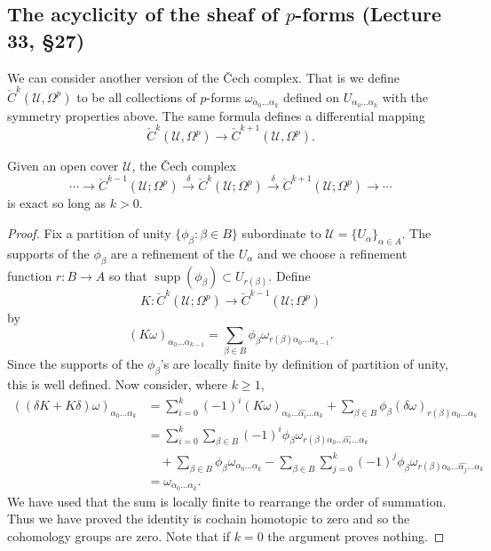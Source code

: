 \subsection*{The acyclicity of the sheaf of $p$-forms (Lecture 33, \S27)}
We can consider another version of the \v Cech complex. That is we define $\check C^k(\mathcal U,\Omega^p)$ to be all collections of $p$-forms $\omega_{\alpha_0\ldots\alpha_k}$ defined on $U_{\alpha_0\ldots\alpha_k}$ with the symmetry properties above. The same formula defines a differential mapping
\[
\check C^k(\mathcal U,\Omega^p)\longrightarrow\check C^{k+1}(\mathcal U,\Omega^p).
\]
\begin{lemma}[27.1]
Given an open cover $\mathcal U$, the \v Cech complex
\[
\cdots\longrightarrow\check C^{k-1}(\mathcal U;\Omega^p)
\xrightarrow{\delta}\check C^k(\mathcal U;\Omega^p)
\xrightarrow{\delta}\check C^{k+1}(\mathcal U;\Omega^p)\longrightarrow\cdots
\]
is exact so long as $k>0$.
\end{lemma}
\begin{proof}
Fix a partition of unity $\{\phi_\beta:\beta\in B\}$ subordinate to $\mathcal U=\{U_\alpha\}_{\alpha\in A}$. The supports of the $\phi_\beta$ are a refinement of the $U_\alpha$ and we choose a refinement function $r:B\to A$ so that $\operatorname{supp}(\phi_\beta)\subset U_{r(\beta)}$. Define
\[
K:\check C^k(\mathcal U;\Omega^p)\longrightarrow\check C^{k-1}(\mathcal U;\Omega^p)
\]
by
\[
(K\omega)_{\alpha_0\ldots\alpha_{k-1}}
=\sum_{\beta\in B}\phi_\beta\omega_{r(\beta)\alpha_0\ldots\alpha_{k-1}}.
\]
Since the supports of the $\phi_\beta$'s are locally finite by definition of partition of unity, this is well defined. Now consider, where $k\ge1$,
\begin{align*}
((\delta K+K\delta)\omega)_{\alpha_0\ldots\alpha_k}
&=\sum_{i=0}^k(-1)^i(K\omega)_{\alpha_0\ldots\widehat{\alpha_i}\ldots\alpha_k}
 +\sum_{\beta\in B}\phi_\beta(\delta\omega)_{r(\beta)\alpha_0\ldots\alpha_k}\\
&=\sum_{i=0}^k\sum_{\beta\in B}(-1)^i\phi_\beta
\omega_{r(\beta)\alpha_0\ldots\widehat{\alpha_i}\ldots\alpha_k}\\
&\quad+\sum_{\beta\in B}\phi_\beta\omega_{\alpha_0\ldots\alpha_k}
-\sum_{\beta\in B}\sum_{j=0}^k(-1)^j\phi_\beta
\omega_{r(\beta)\alpha_0\ldots\widehat{\alpha_j}\ldots\alpha_k}\\
&=\omega_{\alpha_0\ldots\alpha_k}.
\end{align*}
We have used that the sum is locally finite to rearrange the order of summation. Thus we have proved the identity is cochain homotopic to zero and so the cohomology groups are zero. Note that if $k=0$ the argument proves nothing.
\end{proof}

